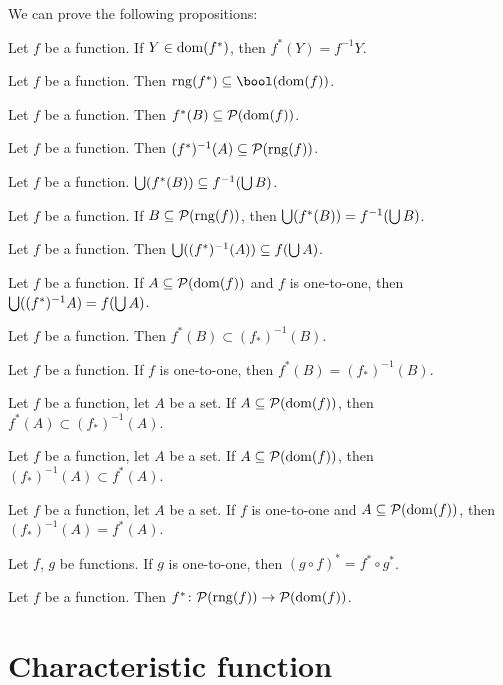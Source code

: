 \documentclass{article}
\begin{document}
We can prove the following propositions:
\begin{thm}
\item\label{funct3:21} Let $f$ be a function.
  If $Y\in\operatorname{dom}(f^{*})$, then $f^{*}(Y)=f^{-1}Y$.
\item\label{funct3:22} Let $f$ be a function.
  Then $\rng(f^{*})\subset\bool(\dom(f))$.
\item\label{funct3:23} Let $f$ be a function.
  Then $f^{*}(B)\subseteq\mathcal{P}(\operatorname{dom}(f))$.
\item\label{funct3:24} Let $f$ be a function.
  Then $(f^{*})^{-1}(A)\subseteq\mathcal{P}(\operatorname{rng}(f))$.
\item\label{funct3:25} Let $f$ be a function.
  $\bigcup(f^{*}(B))\subseteq f^{-1}(\bigcup B)$.
\item\label{funct3:26} Let $f$ be a function.
  If $B\subseteq\mathcal{P}(\operatorname{rng}(f))$,
  then $\bigcup(f^{*}(B))=f^{-1}(\bigcup B)$.
\item\label{funct3:27} Let $f$ be a function.
  Then $\bigcup((f^{*})^{-1}(A))\subseteq f(\bigcup A)$.
\item\label{funct3:28} Let $f$ be a function.
  If $A\subseteq\mathcal{P}(\operatorname{dom}(f))$ and $f$ is one-to-one,
  then $\bigcup((f^{*})^{-1}A)=f(\bigcup A)$.
\item\label{funct3:29} Let $f$ be a function.
  Then $f^{*}(B)\subset (f_{*})^{-1}(B)$.
\item\label{funct3:30} Let $f$ be a function.
  If $f$ is one-to-one,
  then $f^{*}(B) = (f_{*})^{-1}(B)$.
\item\label{funct3:31} Let $f$ be a function, let $A$ be a set.
  If $A\subseteq\mathcal{P}(\operatorname{dom}(f))$,
  then $f^{*}(A)\subset (f_{*})^{-1}(A)$.
\item\label{funct3:32} Let $f$ be a function, let $A$ be a set.
  If $A\subseteq\mathcal{P}(\operatorname{dom}(f))$,
  then $(f_{*})^{-1}(A)\subset f^{*}(A)$.
\item\label{funct3:33} Let $f$ be a function, let $A$ be a set.
  If $f$ is one-to-one and $A\subseteq\mathcal{P}(\operatorname{dom}(f))$,
  then $(f_{*})^{-1}(A) = f^{*}(A)$.
\item\label{funct3:34} Let $f$, $g$ be functions.
  If $g$ is one-to-one, then $(g\circ f)^{*}=f^{*}\circ g^{*}$.
\item\label{funct3:35} Let $f$ be a function.
  Then $f^{*}\colon\mathcal{P}(\operatorname{rng}(f))\to\mathcal{P}(\operatorname{dom}(f))$.
\end{thm}

\section{Characteristic function}
\end{document}
